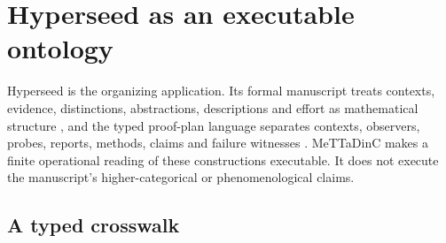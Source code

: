 \documentclass[11pt]{article}
\theoremstyle{definition}
\theoremstyle{plain}
\begin{document}
\section{Hyperseed as an executable ontology}\label{sec:hyperseed}

Hyperseed is the organizing application. Its formal manuscript treats contexts, evidence,
distinctions, abstractions, descriptions and effort as mathematical structure \cite{hyperseed}, and
the typed proof-plan language separates contexts, observers, probes, reports, methods, claims and
failure witnesses \cite{proofplans}. MeTTaDinC makes a finite operational reading of these
constructions executable. It does not execute the manuscript's higher-categorical or
phenomenological claims.

\subsection{A typed crosswalk}
\end{document}
